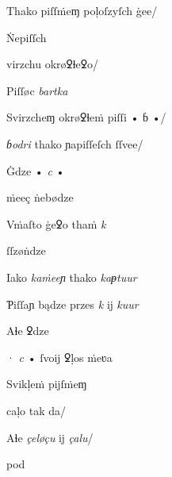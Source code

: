 {\splitverse

Thako piſſṁeɱ poḷoſzyſch ġee/

\newversesubline Ṅepiſſch 


\splitverse virzchu okrøꝿɬeꝿo/

\newversesubline Piſſøc \textit{bartka} \textit{}


\fullverselines

 \textit{} Svirzcheɱ okrøꝿɬeṁ piſſi • ɓ •/


\splitverse

\textit{ɓodri} thako ɲapiſſeſch ſſvee/


\indentVerse Ġdze • \textit{c} • 


\splitverse

 ṁeeç ṅebødze

\indentVerse Vṁaſto ġeꝿo thaṁ \textit{k} 


\splitverse

ſſzøṅdze

\indentVerse Iako \textit{kaṁeeɲ} thako \textit{kaᵽtuur} 

\newpage

\splitverse

Ƥiſſaɲ bądze przes \textit{k} ĳ \textit{kuur}

\indentVerse Aɬe ꝿdze 


\splitverse

· \textit{c} • ſvoĳ ꝿḷos ṁeʋa

\indentVerse Svikḷeṁ pĳſṁeɱ  


\splitverse

caḷo tak da/

\indentVerse Aɬe \textit{çeløçu} ĳ \textit{çalu}/

\indentVerse  pod

}
